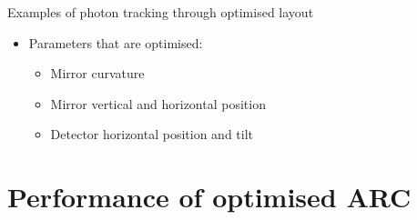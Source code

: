 \documentclass{beamer}
\begin{document}
\begin{frame}{Examples of photon tracking through optimised layout}
\begin{figure}
  \end{figure}
  \vspace{-0.3cm}
  \begin{itemize}
    \item{Parameters that are optimised:}
    \begin{itemize}
      \item{Mirror curvature}
      \item{Mirror vertical and horizontal position}
      \item{Detector horizontal position and tilt}
    \end{itemize}
  \end{itemize}
\end{frame}

\section{Performance of optimised ARC}
\end{document}
